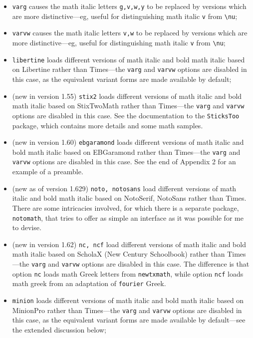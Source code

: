 \documentclass[\fsc]{article}
\theoremstyle{oldplain}
\theoremstyle{plain}
\begin{document}
\begin{itemize}
\begin{verbatim}
\def\setSYdimens{\fontdimen16\font=2pt\fontdimen17\font=1.15\fontdimen17\font }
\end{verbatim}
Don't use these unless you know what you're doing.
\item {\tt varg} causes the math italic letters \verb|g,v,w,y| to be replaced by versions which are more distinctive---eg, useful for distinguishing math italic \verb|v| from \verb|\nu|;
\item {\tt varvw} causes the math italic letters \verb|v,w| to be replaced by versions which are more distinctive---eg, useful for distinguishing math italic \verb|v| from \verb|\nu|;
\item {\tt libertine} loads different versions of math italic and bold math italic based on \textsf{Libertine} rather than \textsf{Times}---the {\tt varg} and {\tt varvw} options are disabled in this case, as the equivalent variant forms are made available by default;
\item (new in version 1.55) {\tt stix2} loads different versions of math italic and bold math italic based on \textsf{StixTwoMath} rather than \textsf{Times}---the {\tt varg} and {\tt varvw} options are disabled in this case. See the documentation to the {\tt SticksToo} package, which contains more details and some math samples.
\item (new in version 1.60) {\tt ebgaramond} loads different versions of math italic and bold math italic based on \textsf{EBGaramond} rather than \textsf{Times}---the {\tt varg} and {\tt varvw} options are disabled in this case. See the end of Appendix 2 for an example of a preamble.
\item (new as of version 1.629) {\tt noto, notosans} load different versions of math italic and bold math italic based on \textsf{NotoSerif}, \textsf{NotoSans}  rather than \textsf{Times}. There are some intricacies involved, for which there is a separate package, {\tt notomath}, that tries to offer as simple an interface as it was possible for me to devise.
\item (new in version 1.62) {\tt nc, ncf} load different versions of math italic and bold math italic based on \textsf{ScholaX} (\textsf{New Century Schoolbook}) rather than \textsf{Times}---the {\tt varg} and {\tt varvw} options are disabled in this case. The difference is that option {\tt nc} loads math Greek letters from {\tt newtxmath}, while option {\tt ncf} loads math greek from an adaptation of {\tt fourier} Greek.
\item {\tt minion} loads different versions of math italic and bold math italic based on \textsf{MinionPro} rather than \textsf{Times}---the {\tt varg} and {\tt varvw} options are disabled in this case, as the equivalent variant forms are made available by default---see the extended discussion below;

\end{itemize}
\end{document}
